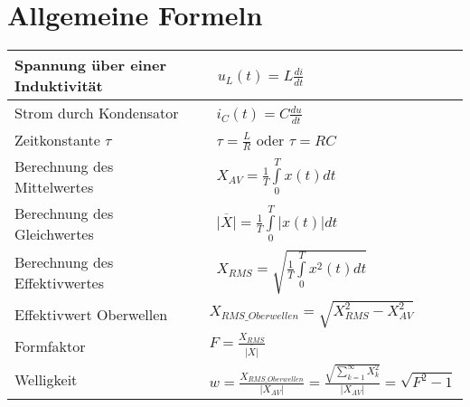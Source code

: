 \section{Allgemeine Formeln}

\begin{tabu}{|l|l|}
	\hline
  Spannung über einer Induktivität
  	&\ $u_{L}(t) = L\frac{di}{dt}$\\
	\hline
  Strom durch Kondensator 
  	&\ $i_{C}(t) = C\frac{du}{dt}$\\
  	\hline
  Zeitkonstante $\tau$
  	&\ $\tau = \frac{L}{R}$ oder $\tau = RC$\\
  	\hline
  Berechnung des Mittelwertes
  	&\ $X_{AV} = \frac{1}{T}\int\limits_{0}^{T}x(t)dt$\\
  	\hline
  Berechnung des Gleichwertes
  	&\ $\overline{|X|} = \frac{1}{T} \int\limits_{0}^{T} |x(t)|dt$\\
  	\hline
  Berechnung des Effektivwertes
  	&\ $X_{RMS} = \sqrt{\frac{1}{T}\int\limits_{0}^{T}x^2(t)dt}$\\
  	\hline
  Effektivwert Oberwellen
    & $X_{RMS\_Oberwellen} = \sqrt{X_{RMS}^2 - X_{AV}^2}$\\
  \hline
  Formfaktor
    & $F = \frac{X_{RMS}}{\overline{|X|}}$\\
  \hline
  Welligkeit
  	& $w = \frac{X_{RMS\_Oberwellen}}{|X_{AV}|}= \frac{\sqrt{\sum_{k = 1}^{\infty}X_{k}^2}}{|X_{AV}|} = \sqrt{F^2-1}$\\
  \hline
\end{tabu}